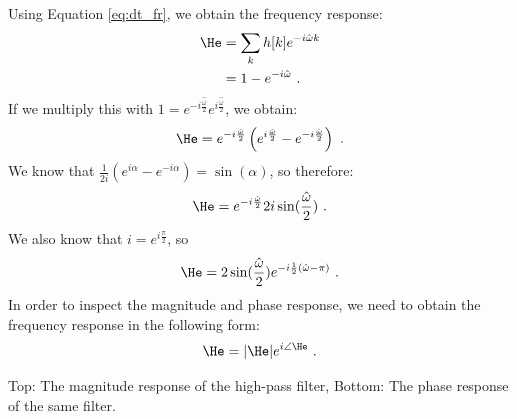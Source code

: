 Using Equation \ref{eq:dt_fr}, we obtain the frequency response:
\begin{align}
\He & = \sum_k h[k] e^{-i\hat{\omega}k}\\
    & = 1 -  e^{-i\hat{\omega}} \,\,.
\end{align}
If we multiply this with $1=e^{-i\frac{\hat{\omega}}{2}}e^{i\frac{\hat{\omega}}{2}}$, we obtain:
\begin{equation}
\He = e^{-i\frac{\hat{\omega}}{2}}\left(e^{i\frac{\hat{\omega}}{2}}-e^{-i\frac{\hat{\omega}}{2}}\right) \,\,.
\end{equation}
We know that $\frac{1}{2i}(e^{i\alpha} - e^{-i\alpha}) = \sin(\alpha)$, so therefore:
\begin{equation}
\He = e^{-i\frac{\hat{\omega}}{2}} 2i \sin(\frac{\hat{\omega}}{2}) \,\,.
\end{equation}
We also know that $i=e^{i\frac{\pi}{2}}$, so 
\begin{equation}
\He = 2\sin(\frac{\hat{\omega}}{2}) e^{-i\frac{1}{2}(\hat{\omega}-\pi)} \,\,.
\end{equation}
In order to inspect the magnitude and phase response, we need to
obtain the frequency response in the following form:
\begin{equation}
\He =|\He |e^{i\angle \He} \,\,.
\end{equation} 

\begin{marginfigure}
\begin{center}

\end{center}
\caption{Top: The magnitude response of the high-pass filter, Bottom: The phase response of the same filter.}
\label{fig:hp_filter_ex}
\end{marginfigure}

